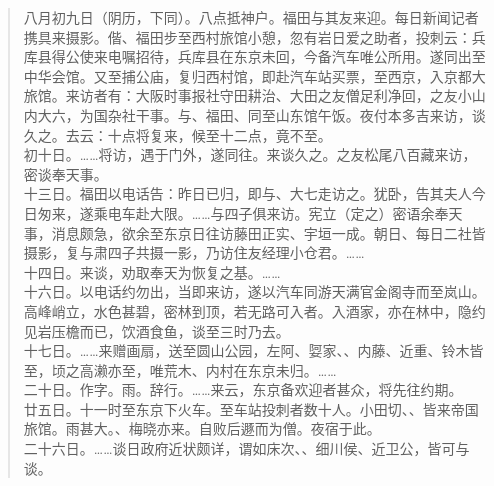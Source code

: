 \begin{quote}
	八月初九日（阴历，下同）。八点抵神户。福田与其友来迎。每日新闻记者携具来摄影。偕、福田步至西村旅馆小憩，忽有岩日爱之助者，投刺云：兵库县得公使来电嘱招待，兵库县在东京未回，今备汽车唯公所用。遂同出至中华会馆。又至捕公庙，复归西村馆，即赴汽车站买票，至西京，入京都大旅馆。来访者有：大阪时事报社守田耕治、大田之友僧足利净回，之友小山内大六，为国杂社干事。与、福田、同至山东馆午饭。夜付本多吉来访，谈久之。去云：十点将复来，候至十二点，竟不至。\\

初十日。……将访，遇于门外，遂同往。来谈久之。之友松尾八百藏来访，密谈奉天事。\\

十三日。福田以电话告：昨日已归，即与、大七走访之。犹卧，告其夫人今日匆来，遂乘电车赴大限。……与四子俱来访。宪立（定之）密语余奉天事，消息颇急，欲余至东京日往访藤田正实、宇垣一成。朝日、每日二社皆摄影，复与肃四子共摄一影，乃访住友经理小仓君。……\\

十四日。来谈，劝取奉天为恢复之基。……\\

十六日。以电话约勿出，当即来访，遂以汽车同游天满官金阁寺而至岚山。高峰峭立，水色甚碧，密林到顶，若无路可入者。入酒家，亦在林中，隐约见岩压檐而已，饮酒食鱼，谈至三时乃去。\\

十七日。……来赠画扇，送至圆山公园，左阿、娿家、、内藤、近重、铃木皆至，顷之高濑亦至，唯荒木、内村在东京未归。……\\

二十日。作字。雨。辞行。……来云，东京备欢迎者甚众，将先往约期。\\

廿五日。十一时至东京下火车。至车站投刺者数十人。小田切、、皆来帝国旅馆。雨甚大。、梅晓亦来。自败后遯而为僧。夜宿于此。\\

二十六日。……谈日政府近状颇详，谓如床次、、细川侯、近卫公，皆可与谈。\\


\end{quote}
